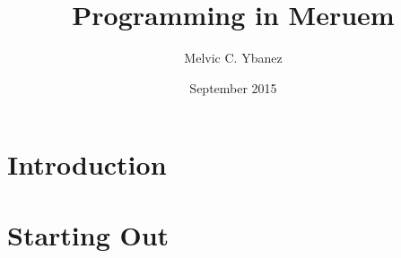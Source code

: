 \documentclass[12pt]{report}
\title{Programming in Meruem}
\author{Melvic C. Ybanez}
\date{September 2015}
\begin{document}
	\maketitle
	
	\tableofcontents
	
	\chapter*{Introduction}
		
	
	\chapter{Starting Out}
	
\end{document}
